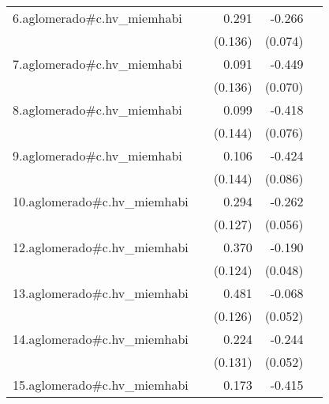 {\begin{longtable}{l*{4}{D{.}{.}{-1}}}
\addlinespace
6.aglomerado#c.hv\_miemhabi&                     &       0.291\sym{*}  &      -0.266\sym{***}&                     \\
            &                     &     (0.136)         &     (0.074)         &                     \\
\addlinespace
7.aglomerado#c.hv\_miemhabi&                     &       0.091         &      -0.449\sym{***}&                     \\
            &                     &     (0.136)         &     (0.070)         &                     \\
\addlinespace
8.aglomerado#c.hv\_miemhabi&                     &       0.099         &      -0.418\sym{***}&                     \\
            &                     &     (0.144)         &     (0.076)         &                     \\
\addlinespace
9.aglomerado#c.hv\_miemhabi&                     &       0.106         &      -0.424\sym{***}&                     \\
            &                     &     (0.144)         &     (0.086)         &                     \\
\addlinespace
10.aglomerado#c.hv\_miemhabi&                     &       0.294\sym{*}  &      -0.262\sym{***}&                     \\
            &                     &     (0.127)         &     (0.056)         &                     \\
\addlinespace
12.aglomerado#c.hv\_miemhabi&                     &       0.370\sym{**} &      -0.190\sym{***}&                     \\
            &                     &     (0.124)         &     (0.048)         &                     \\
\addlinespace
13.aglomerado#c.hv\_miemhabi&                     &       0.481\sym{***}&      -0.068         &                     \\
            &                     &     (0.126)         &     (0.052)         &                     \\
\addlinespace
14.aglomerado#c.hv\_miemhabi&                     &       0.224         &      -0.244\sym{***}&                     \\
            &                     &     (0.131)         &     (0.052)         &                     \\
\addlinespace
15.aglomerado#c.hv\_miemhabi&                     &       0.173         &      -0.415\sym{***}&                     \\

\end{longtable}}
